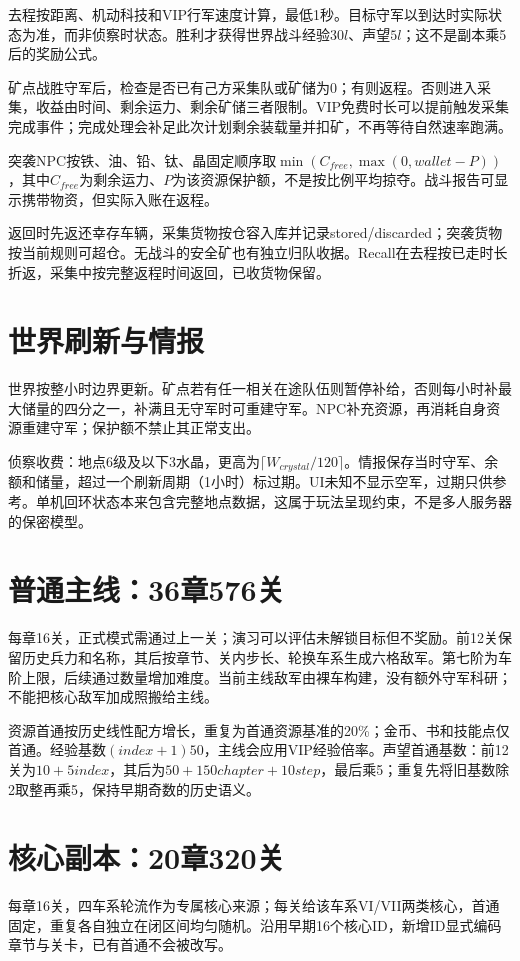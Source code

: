 去程按距离、机动科技和VIP行军速度计算，最低1秒。目标守军以到达时实际状态为准，而非侦察时状态。胜利才获得世界战斗经验\(30l\)、声望\(5l\)；这不是副本乘5后的奖励公式。

矿点战胜守军后，检查是否已有己方采集队或矿储为0；有则返程。否则进入采集，收益由时间、剩余运力、剩余矿储三者限制。VIP免费时长可以提前触发采集完成事件；完成处理会补足此次计划剩余装载量并扣矿，不再等待自然速率跑满。

突袭NPC按铁、油、铅、钛、晶固定顺序取\(\min(C_{free},\max(0,wallet-P))\)，其中\(C_{free}\)为剩余运力、\(P\)为该资源保护额，不是按比例平均掠夺。战斗报告可显示携带物资，但实际入账在返程。

返回时先返还幸存车辆，采集货物按仓容入库并记录stored/discarded；突袭货物按当前规则可超仓。无战斗的安全矿也有独立归队收据。Recall在去程按已走时长折返，采集中按完整返程时间返回，已收货物保留。

\section{世界刷新与情报}
世界按整小时边界更新。矿点若有任一相关在途队伍则暂停补给，否则每小时补最大储量的四分之一，补满且无守军时可重建守军。NPC补充资源，再消耗自身资源重建守军；保护额不禁止其正常支出。

侦察收费：地点6级及以下3水晶，更高为\(\lceil W_{crystal}/120\rceil\)。情报保存当时守军、余额和储量，超过一个刷新周期（1小时）标过期。UI未知不显示空军，过期只供参考。单机回环状态本来包含完整地点数据，这属于玩法呈现约束，不是多人服务器的保密模型。

\section{普通主线：36章576关}
每章16关，正式模式需通过上一关；演习可以评估未解锁目标但不奖励。前12关保留历史兵力和名称，其后按章节、关内步长、轮换车系生成六格敌军。第七阶为车阶上限，后续通过数量增加难度。当前主线敌军由裸车构建，没有额外守军科研；不能把核心敌军加成照搬给主线。

资源首通按历史线性配方增长，重复为首通资源基准的20\%；金币、书和技能点仅首通。经验基数\((index+1)50\)，主线会应用VIP经验倍率。声望首通基数：前12关为\(10+5index\)，其后为\(50+150chapter+10step\)，最后乘5；重复先将旧基数除2取整再乘5，保持早期奇数的历史语义。

\section{核心副本：20章320关}
每章16关，四车系轮流作为专属核心来源；每关给该车系VI/VII两类核心，首通固定，重复各自独立在闭区间均匀随机。沿用早期16个核心ID，新增ID显式编码章节与关卡，已有首通不会被改写。

